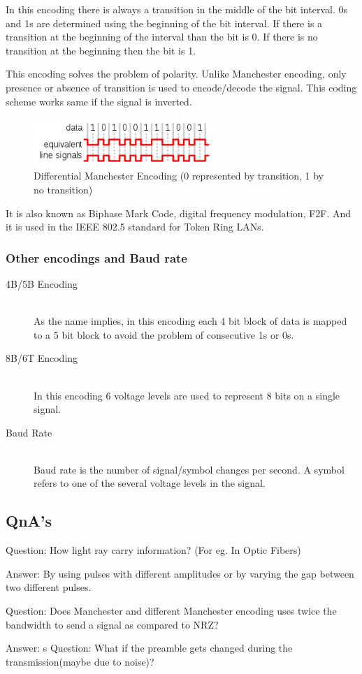 In this encoding there is always a transition in the middle of the bit interval. 0s and 1s are determined using the beginning of the bit interval. If there is a transition at the beginning of the interval than the bit is 0. If there is no transition at the beginning then the bit is 1.

This encoding solves the problem of polarity. Unlike Manchester encoding, only presence or absence of transition is used to encode/decode the signal. This coding scheme works same if the signal is inverted.

\begin{figure}[H]
    \centering
    \includegraphics[width=0.6\textwidth]{img/DM.png}
    \caption{Differential Manchester Encoding (0 represented by transition, 1 by no transition)}
    \label{fig:DM}
\end{figure}

It is also known as Biphase Mark Code, digital frequency modulation, F2F. And it is used in the IEEE 802.5 standard for Token Ring LANs.

\subsubsection{Other encodings and Baud rate}
\begin{description}
  \item[4B/5B Encoding] \hfill \\ As the name implies, in this encoding each 4 bit block of data is mapped to a 5 bit block to avoid the problem of consecutive 1s or 0s.
  \item[8B/6T Encoding] \hfill \\ In this encoding 6 voltage levels are used to represent 8 bits on a single signal.
  \item[Baud Rate] \hfill \\ Baud rate is the number of signal/symbol changes per second. A symbol refers to one of the several voltage levels in the signal.
\end{description}

\subsection{QnA's}

Question: How light ray carry information? (For eg. In Optic Fibers)

Answer: By using pulses with different amplitudes or by varying the gap between two different pulses.

Question: Does Manchester and different Manchester encoding uses twice the bandwidth to send a signal as compared to NRZ?

Answer:
s
Question: What if the preamble gets changed during the transmission(maybe due to noise)?

